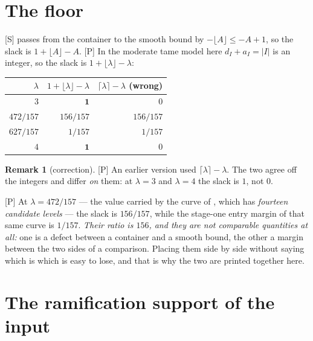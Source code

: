 \documentclass[11pt]{article}
\theoremstyle{plain}
\theoremstyle{definition}
\newtheorem{remark}{Remark}
\begin{document}
\section{The floor}\label{s:floor}

\textup{[S]} \cite[Prop.~1.4(iii)]{IUT4} passes from the container to the smooth bound
by $-\lfloor A\rfloor\le-A+1$, so the slack is $1+\lfloor A\rfloor-A$.  \textup{[P]} In
the moderate tame model here $d_I+a_I=|I|$ is an integer, so the slack is
$1+\lfloor\lambda\rfloor-\lambda$:

\begin{center}
\begin{tabular}{rrr}
\toprule
$\lambda$ & $1+\lfloor\lambda\rfloor-\lambda$ & $\lceil\lambda\rceil-\lambda$ (wrong)\\
\midrule
$3$ & $\mathbf 1$ & $0$\\
$472/157$ & $156/157$ & $156/157$\\
$627/157$ & $1/157$ & $1/157$\\
$4$ & $\mathbf 1$ & $0$\\
\bottomrule
\end{tabular}
\end{center}

\begin{remark}[correction]\label{r:floor}
\textup{[P]} An earlier version used $\lceil\lambda\rceil-\lambda$.  The two agree off
the integers and differ \emph{on} them: at $\lambda=3$ and $\lambda=4$ the slack is $1$,
not $0$.
\end{remark}

\textup{[P]} At $\lambda=472/157$ --- the value carried by the curve of
\cite[\S13]{Second}, which has \emph{fourteen candidate levels} --- the slack is
$156/157$, while the stage-one entry margin of that same curve is $1/157$.  \emph{Their ratio is $156$, and they are not
comparable quantities at all:} one is a defect between a container and a smooth bound, the other a margin
between the two sides of a comparison.  Placing them side by side without saying which
is which is easy to lose, and that is why the two are printed together here.

\section{The ramification support of the input}\label{s:supp}
\end{document}
